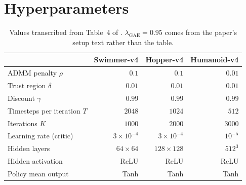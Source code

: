 \section{Hyperparameters}
\label{app:hyperparameters}

\begin{table}[H]
  \centering
  \caption{Values transcribed from Table~4 of \citet{lan2023fednpgadmm}.
  $\lambda_{\text{GAE}} = 0.95$ comes from the paper's setup text rather than
  the table.}
  \label{tab:table4}
  \begin{tabular}{lrrr}
    \toprule
     & Swimmer-v4 & Hopper-v4 & Humanoid-v4 \\
    \midrule
    ADMM penalty $\rho$        & $0.1$   & $0.1$   & $0.01$ \\
    Trust region $\delta$      & $0.01$  & $0.01$  & $0.01$ \\
    Discount $\gamma$          & $0.99$  & $0.99$  & $0.99$ \\
    Timesteps per iteration $T$& $2048$  & $1024$  & $512$ \\
    Iterations $K$             & $1000$  & $2000$  & $3000$ \\
    Learning rate (critic)     & $3\times10^{-4}$ & $3\times10^{-4}$ & $10^{-5}$ \\
    Hidden layers              & $64\times64$ & $128\times128$ & $512^{3}$ \\
    Hidden activation          & ReLU & ReLU & ReLU \\
    Policy mean output         & Tanh & Tanh & Tanh \\
    \bottomrule
  \end{tabular}
\end{table}

